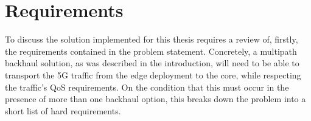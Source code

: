 
\cleardoublepage
\chapter{Requirements}
\label{cha:requirements}



To discuss the solution implemented for this thesis requires a review of, firstly, the requirements contained in the problem statement. Concretely, a multipath backhaul solution, as was described in the introduction, will need to be able to transport the 5G traffic from the edge deployment to the core, while respecting the traffic's QoS requirements. On the condition that this must occur in the presence of more than one backhaul option, this breaks down the problem into a short list of hard requirements.

